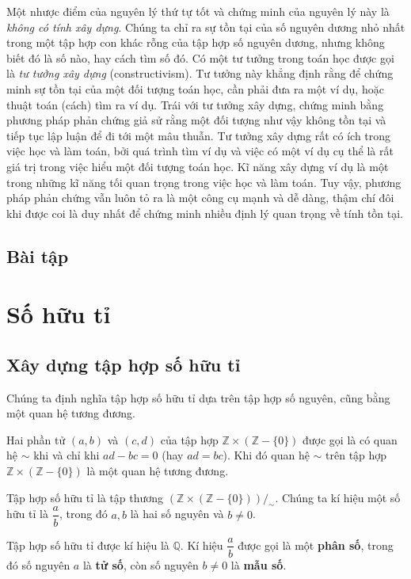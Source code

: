 Một nhược điểm của nguyên lý thứ tự tốt và chứng minh của nguyên lý này là \textit{không có tính xây dựng}. Chúng ta chỉ ra sự tồn tại của số nguyên dương nhỏ nhất trong một tập hợp con khác rỗng của tập hợp số nguyên dương, nhưng không biết đó là số nào, hay cách tìm số đó. Có một tư tưởng trong toán học được gọi là \textit{tư tưởng xây dựng} (constructivism). Tư tưởng này khẳng định rằng để chứng minh sự tồn tại của một đối tượng toán học, cần phải đưa ra một ví dụ, hoặc thuật toán (cách) tìm ra ví dụ. Trái với tư tưởng xây dựng, chứng minh bằng phương pháp phản chứng giả sử rằng một đối tượng như vậy không tồn tại và tiếp tục lập luận để đi tới một mâu thuẫn. Tư tưởng xây dựng rất có ích trong việc học và làm toán, bởi quá trình tìm ví dụ và việc có một ví dụ cụ thể là rất giá trị trong việc hiểu một đối tượng toán học. Kĩ năng xây dựng ví dụ là một trong những kĩ năng tối quan trọng trong việc học và làm toán. Tuy vậy, phương pháp phản chứng vẫn luôn tỏ ra là một công cụ mạnh và dễ dàng, thậm chí đôi khi được coi là duy nhất để chứng minh nhiều định lý quan trọng về tính tồn tại.

\subsection{Bài tập}

\section{Số hữu tỉ}

\subsection{Xây dựng tập hợp số hữu tỉ}

Chúng ta định nghĩa tập hợp số hữu tỉ dựa trên tập hợp số nguyên, cũng bằng một quan hệ tương đương.
\begin{theorem}
    Hai phần tử $(a, b)$ và $(c, d)$ của tập hợp $\mathbb{Z}\times(\mathbb{Z} - \{0\})$ được gọi là có quan hệ $\sim$ khi và chỉ khi $a d - b c = 0$ (hay $a d = b c$). Khi đó quan hệ $\sim$ trên tập hợp $\mathbb{Z}\times(\mathbb{Z} - \{0\})$ là một quan hệ tương đương.
\end{theorem}

\begin{definition}
   Tập hợp số hữu tỉ là tập thương ${(\mathbb{Z}\times (\mathbb{Z} - \{0\}))}/_{\sim}$. Chúng ta kí hiệu một số hữu tỉ là $\dfrac{a}{b}$, trong đó $a, b$ là hai số nguyên và $b\ne 0$.
   
   Tập hợp số hữu tỉ được kí hiệu là $\mathbb{Q}$. Kí hiệu $\dfrac{a}{b}$ được gọi là một \textbf{phân số}, trong đó số nguyên $a$ là \textbf{tử số}, còn số nguyên $b\ne 0$ là \textbf{mẫu số}.
\end{definition}

